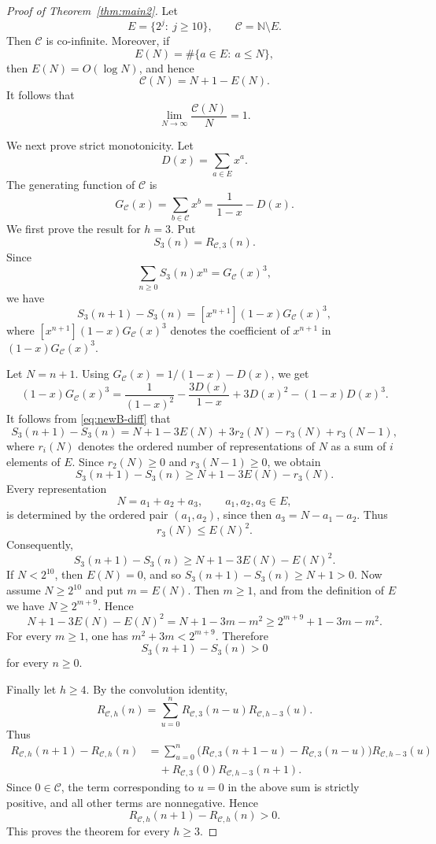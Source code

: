\documentclass[11pt]{amsart}
\theoremstyle{remark}
\theoremstyle{plain}
\newcommand{\NewB}{\mathcal C}
\begin{document}
\begin{proof}[Proof of Theorem~\ref{thm:main2}]
Let
\[
E=\{2^j:\ j\ge 10\},\qquad \NewB=\mathbb N\setminus E.
\]
Then $\NewB$ is co-infinite. Moreover, if
\[
E(N)=\#\{a\in E:\ a\le N\},
\]
then $E(N)=O(\log N)$, and hence
\[
\NewB(N)=N+1-E(N).
\]
It follows that
\[
\lim_{N\to\infty}\frac{\NewB(N)}{N}=1.
\]

We next prove strict monotonicity. Let
\[
D(x)=\sum_{a\in E}x^a.
\]
The generating function of $\NewB$ is
\[
G_{\NewB}(x)=\sum_{b\in \NewB}x^b=\frac1{1-x}-D(x).
\]
We first prove the result for $h=3$. Put
\[
S_3(n)=R_{\NewB,3}(n).
\]
Since
\[
\sum_{n\ge0}S_3(n)x^n=G_{\NewB}(x)^3,
\]
we have
\begin{equation}\label{eq:newB-diff}
S_3(n+1)-S_3(n)=[x^{n+1}](1-x)G_{\NewB}(x)^3,
\end{equation}
where $[x^{n+1}](1-x)G_{\NewB}(x)^3$ denotes the coefficient of $x^{n+1}$ in $(1-x)G_{\NewB}(x)^3$.

Let $N=n+1$. Using $G_{\NewB}(x)=1/(1-x)-D(x)$, we get
\[
(1-x)G_{\NewB}(x)^3
=\frac1{(1-x)^2}-\frac{3D(x)}{1-x}+3D(x)^2-(1-x)D(x)^3.
\]
It follows from \eqref{eq:newB-diff} that
\[
S_3(n+1)-S_3(n)=N+1-3E(N)+3r_2(N)-r_3(N)+r_3(N-1),
\]
where $r_i(N)$ denotes the ordered number of representations of $N$ as a sum of $i$ elements of $E$.
Since $r_2(N)\ge0$ and $r_3(N-1)\ge0$, we obtain
\[
S_3(n+1)-S_3(n)\ge N+1-3E(N)-r_3(N).
\]
Every representation
\[
N=a_1+a_2+a_3,\qquad a_1,a_2,a_3\in E,
\]
is determined by the ordered pair $(a_1,a_2)$, since then $a_3=N-a_1-a_2$. Thus
\[
r_3(N)\le E(N)^2.
\]
Consequently,
\[
S_3(n+1)-S_3(n)\ge N+1-3E(N)-E(N)^2.
\]
If $N<2^{10}$, then $E(N)=0$, and so $S_3(n+1)-S_3(n)\ge N+1>0$.
Now assume $N\ge 2^{10}$ and put $m=E(N)$. Then $m\ge 1$, and from the definition of $E$ we have $N\ge 2^{m+9}$. Hence
\[
N+1-3E(N)-E(N)^2=N+1-3m-m^2\ge 2^{m+9}+1-3m-m^2.
\]
For every $m\ge1$, one has $m^2+3m<2^{m+9}$. Therefore
\[
S_3(n+1)-S_3(n)>0
\]
for every $n\ge0$.

Finally let $h\ge4$. By the convolution identity,
\[
R_{\NewB,h}(n)=\sum_{u=0}^n R_{\NewB,3}(n-u)R_{\NewB,h-3}(u).
\]
Thus
\[
\begin{aligned}
R_{\NewB,h}(n+1)-R_{\NewB,h}(n)
&=\sum_{u=0}^{n}\bigl(R_{\NewB,3}(n+1-u)-R_{\NewB,3}(n-u)\bigr)R_{\NewB,h-3}(u)\\
&\quad +R_{\NewB,3}(0)R_{\NewB,h-3}(n+1).
\end{aligned}
\]
Since $0\in \NewB$, the term corresponding to $u=0$ in the above sum is strictly positive, and all other terms are nonnegative. Hence
\[
R_{\NewB,h}(n+1)-R_{\NewB,h}(n)>0.
\]
This proves the theorem for every $h\ge3$.
\end{proof}
\end{document}
